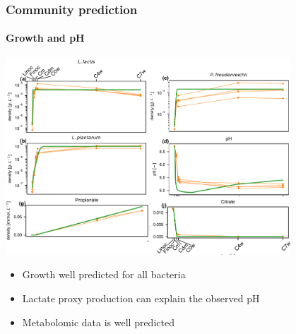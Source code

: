\documentclass[8pt,usenames,dvipsnames]{beamer}
\begin{document}
\begin{frame}
\frametitle{Community prediction}
\framesubtitle{Growth and pH}
\centering
\includegraphics[width=0.8\textwidth]{figures/community-pred-growth.pdf}
\begin{block}{}
\begin{itemize}
\item Growth well predicted for all bacteria
\item Lactate proxy production can explain the observed pH
\item Metabolomic data is well predicted 
\end{itemize}
\end{block}
\end{frame}
\end{document}
